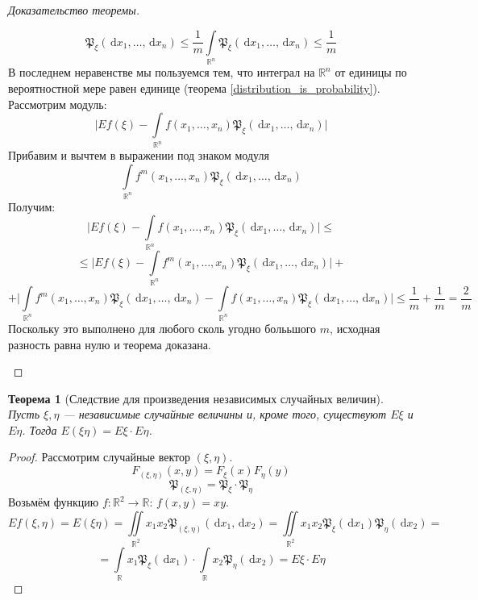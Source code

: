 \documentclass[11pt,openany,a4paper]{scrartcl}
\theoremstyle{plain}
\newtheorem{theorem}{Теорема}[subsection]
\theoremstyle{definition}
\newcommand\mb{\mathbb}
\newcommand\real{\mb R}
\newcommand{\dif}{\, \mathrm d}
\begin{document}
\begin{proof}[Доказательство теоремы]
\begin{enumerate}
$$        \mathfrak P_\xi(\dif x_1, \ldots, \dif x_n) \leqslant
        \frac{1}{m} \int\limits_{\real^n}\mathfrak P_\xi(\dif x_1, \ldots, \dif x_n)
        \leqslant\frac{1}{m}
        $$
        В последнем неравенстве мы пользуемся тем, что интеграл на $\real^n$ от единицы
        по вероятностной мере равен единице (теорема \ref{distribution_is_probability}).
        Рассмотрим модуль:
        $$
        \Bigg| Ef(\xi) - \int\limits_{\real^n} f(x_1, \ldots, x_n)
        \mathfrak P_\xi(\dif x_1, \ldots, \dif x_n)\Bigg|
        $$
        Прибавим и вычтем в выражении под знаком модуля
        $$
        \int\limits_{\real^n} f^m(x_1, \ldots, x_n)
        \mathfrak P_\xi(\dif x_1, \ldots, \dif x_n)
        $$
        Получим:
        $$
        \Bigg| Ef(\xi) - \int\limits_{\real^n} f(x_1, \ldots, x_n)
        \mathfrak P_\xi(\dif x_1, \ldots, \dif x_n)\Bigg| \leqslant
        $$
        $$
        \leqslant\Bigg| Ef(\xi) - \int\limits_{\real^n} f^m(x_1, \ldots, x_n)
        \mathfrak P_\xi(\dif x_1, \ldots, \dif x_n)\Bigg| +
        $$
        $$
        +\Bigg|\int\limits_{\real^n}f^m(x_1, \ldots, x_n)
        \mathfrak P_\xi(\dif x_1, \ldots, \dif x_n) -
        \int\limits_{\real^n}f(x_1, \ldots, x_n)
        \mathfrak P_\xi(\dif x_1, \ldots, \dif x_n)\Bigg| \leqslant
        \frac{1}{m} + \frac{1}{m} = \frac{2}{m}
        $$
        Поскольку это выполнено для любого сколь угодно болььшого $m$,
        исходная разность равна нулю
        и теорема доказана.
    \end{enumerate}
\end{proof}

\begin{theorem}[Следствие для произведения независимых случайных величин]
    \label{expectation_for_independent_variables}
    Пусть $\xi, \eta$ — независимые случайные величины и, кроме того,
    существуют $E\xi$ и $E\eta$. Тогда $E(\xi\eta) = E\xi \cdot E\eta$.
\end{theorem}
\begin{proof}
    Рассмотрим случайные вектор $(\xi, \eta)$.
    $$
    F_{(\xi, \eta)}(x, y) = F_\xi(x)F_\eta(y)
    $$
    $$
    \mathfrak P_{(\xi, \eta)} = \mathfrak P_\xi \cdot \mathfrak P_\eta
    $$
    Возьмём функцию $f: \real^2 \to \real$: $f(x, y) = xy$.
    $$
    Ef(\xi, \eta) = E(\xi\eta) = \iint\limits_{\real^2} x_1x_2
    \mathfrak P_{(\xi, \eta)}(\dif x_1, \dif x_2) =
    \iint\limits_{\real^2} x_1x_2 \mathfrak P_\xi(\dif x_1)
    \mathfrak P_\eta(\dif x_2) =
    $$
    $$
    = \int\limits_{\real} x_1\mathfrak P_\xi(\dif x_1) \cdot
    \int\limits_{\real} x_2\mathfrak P_\eta(\dif x_2) =
    E\xi \cdot E\eta
    $$
\end{proof}
\end{document}
